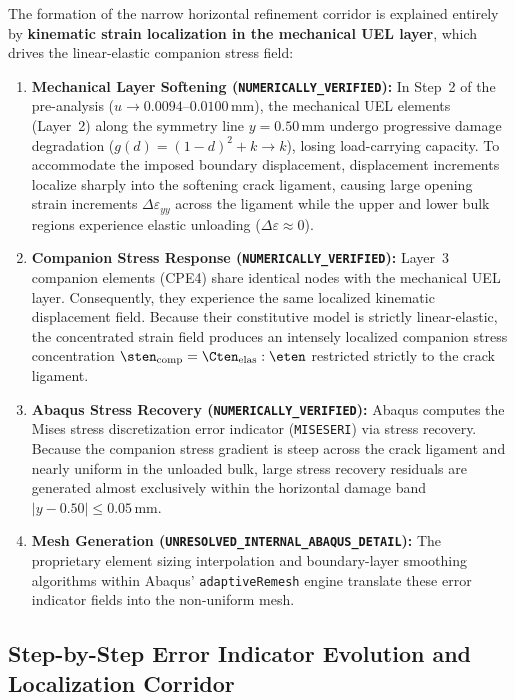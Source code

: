 The formation of the narrow horizontal refinement corridor is explained entirely by \textbf{kinematic strain localization in the mechanical UEL layer}, which drives the linear-elastic companion stress field:
\begin{enumerate}
    \item \textbf{Mechanical Layer Softening (\texttt{NUMERICALLY\_VERIFIED}):} In Step~2 of the pre-analysis ($u \to 0.0094\text{--}0.0100\,\mathrm{mm}$), the mechanical UEL elements (Layer~2) along the symmetry line $y = 0.50\,\mathrm{mm}$ undergo progressive damage degradation ($g(d) = (1-d)^2 + k \to k$), losing load-carrying capacity. To accommodate the imposed boundary displacement, displacement increments localize sharply into the softening crack ligament, causing large opening strain increments $\Delta\varepsilon_{yy}$ across the ligament while the upper and lower bulk regions experience elastic unloading ($\Delta\varepsilon \approx 0$).
    \item \textbf{Companion Stress Response (\texttt{NUMERICALLY\_VERIFIED}):} Layer~3 companion elements (CPE4) share identical nodes with the mechanical UEL layer. Consequently, they experience the same localized kinematic displacement field. Because their constitutive model is strictly linear-elastic, the concentrated strain field produces an intensely localized companion stress concentration $\sten_{\mathrm{comp}} = \Cten_{\mathrm{elas}} : \eten$ restricted strictly to the crack ligament.
    \item \textbf{Abaqus Stress Recovery (\texttt{NUMERICALLY\_VERIFIED}):} Abaqus computes the Mises stress discretization error indicator (\texttt{MISESERI}) via stress recovery. Because the companion stress gradient is steep across the crack ligament and nearly uniform in the unloaded bulk, large stress recovery residuals are generated almost exclusively within the horizontal damage band $|y - 0.50| \le 0.05\,\mathrm{mm}$.
    \item \textbf{Mesh Generation (\texttt{UNRESOLVED\_INTERNAL\_ABAQUS\_DETAIL}):} The proprietary element sizing interpolation and boundary-layer smoothing algorithms within Abaqus' \texttt{adaptiveRemesh} engine translate these error indicator fields into the non-uniform mesh.
\end{enumerate}

\subsection{Step-by-Step Error Indicator Evolution and Localization Corridor}
\label{subsec:stage14r_evolution}

